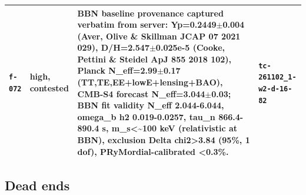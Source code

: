 \documentclass[11pt,a4paper]{article}
\begin{document}
\begin{longtable}{@{}p{}p{}p{}p{}@{}}
\texttt{f-072} & high, \textbf{contested} & BBN baseline provenance captured verbatim from server: Yp=0.2449$\pm$0.004 (Aver, Olive \& Skillman JCAP 07 2021 029), D/H=2.547$\pm$0.025e-5 (Cooke, Pettini \& Steidel ApJ 855 2018 102), Planck N\_eff=2.99$\pm$0.17 (TT,TE,EE+lowE+lensing+BAO), CMB-S4 forecast N\_eff=3.044$\pm$0.03; BBN fit validity N\_eff 2.044-6.044, omega\_b h2 0.019-0.0257, tau\_n 866.4-890.4 s, m\_s\textless{}\textasciitilde{}100 keV (relativistic at BBN), exclusion Delta chi2\textgreater{}3.84 (95\%, 1 dof), PRyMordial-calibrated \textless{}0.3\%. & \texttt{tc-261102\_\allowbreak{}1-w2-d-16-82} \\
\bottomrule\end{longtable}
\subsection{Dead ends}
\end{document}
